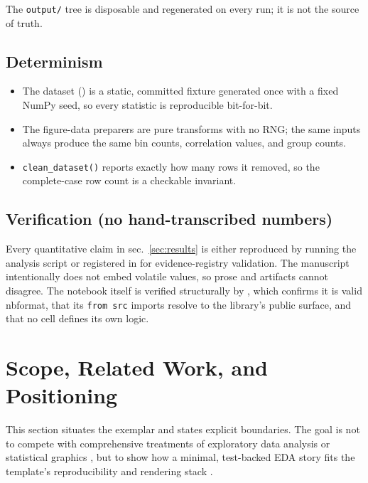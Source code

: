 \documentclass[
]{article}
\providecommand{\tightlist}{%
  \setlength{\itemsep}{0pt}\setlength{\parskip}{0pt}}
\begin{document}
The \texttt{output/} tree is disposable and regenerated on every run; it
is not the source of truth.

\subsection{Determinism}\label{determinism}

\begin{itemize}
\tightlist
\item
  The dataset () is a static, committed
  fixture generated once with a fixed NumPy seed, so every statistic is
  reproducible bit-for-bit.
\item
  The figure-data preparers are pure transforms with no RNG; the same
  inputs always produce the same bin counts, correlation values, and
  group counts.
\item
  \texttt{clean\_dataset()} reports exactly how many rows it removed, so
  the complete-case row count is a checkable invariant.
\end{itemize}

\subsection{Verification (no hand-transcribed
numbers)}\label{verification-no-hand-transcribed-numbers}

Every quantitative claim in sec.~\ref{sec:results} is either reproduced
by running the analysis script or registered in
 for evidence-registry validation. The
manuscript intentionally does not embed volatile values, so prose and
artifacts cannot disagree. The notebook itself is verified structurally
by , which confirms it is valid
nbformat, that its \texttt{from\ src} imports resolve to the library's
public surface, and that no cell defines its own logic.

\newpage

\section{Scope, Related Work, and Positioning}\label{sec:scope}

This section situates the exemplar and states explicit boundaries. The
goal is not to compete with comprehensive treatments of exploratory data
analysis \citep{tukey1977eda} or statistical graphics
\citep{wilkinson2005grammar}, but to show how a minimal, test-backed EDA
story fits the template's reproducibility and rendering stack
\citep{peng2011reproducible}.
\end{document}
